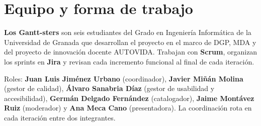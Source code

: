 \documentclass[11pt,a4paper]{article}
\newcommand{\hl}[1]{\textcolor{gblue}{\textbf{#1}}}
\begin{document}
\section{Equipo y forma de trabajo}
\hl{Los Gantt-sters} son seis estudiantes del Grado en Ingeniería Informática de la Universidad de Granada que desarrollan el proyecto en el marco de DGP, MDA y del proyecto de innovación docente AUTOVIDA. Trabajan con \hl{Scrum}, organizan los sprints en \hl{Jira} y revisan cada incremento funcional al final de cada iteración.

Roles: \hl{Juan Luis Jiménez Urbano} (coordinador), \hl{Javier Miñán Molina} (gestor de calidad), \hl{Álvaro Sanabria Díaz} (gestor de usabilidad y accesibilidad), \hl{Germán Delgado Fernández} (catalogador), \hl{Jaime Montávez Ruiz} (moderador) y \hl{Ana Meca Cano} (presentadora). La coordinación rota en cada iteración entre dos integrantes.
\end{document}
